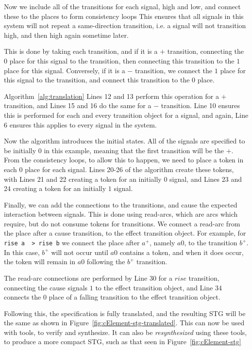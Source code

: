 \documentclass[british,conference,compsoc]{IEEEtran}
\begin{document}
Now we include all of the 
transitions for each signal, high and low, and connect these to the places to form consistency loops
This ensures that all signals in this system will not repeat a same-direction transition, i.e. a signal will
not transition high, and then high again sometime later.

This is done by taking each transition, and if it is a $+$ transition, 
connecting the $0$ place for this signal to the transition, then connecting 
this transition to the $1$ place for this signal. Conversely, if it is a $-$ 
transition, we connect the $1$ place for this signal to the transition, and 
connect this transition to the $0$ place.

Algorithm~\ref{alg:translation} Lines 12 and 13 perform this operation for a $+$ transition,
and Lines 15 and 16 do the same for a $-$ transition. Line 10 ensures this is performed for 
each and every transition object for a signal, and again, Line 6 ensures this applies to every signal
in the system. 

Now the algorithm introduces the initial states. All of the signals are 
specified to be initially 0 in this example, meaning that the first transition will be the $+$.
From the consistency loops, to allow this to happen, we need to place a token 
in each $0$ place for each signal. Lines 20-26 of the algorithm create these tokens,
with Lines 21 and 22 creating a token for an initially $0$ signal, and Lines 23 and 24 
creating a token for an initially $1$ signal. 

Finally, we can add the connections to the transitions, and cause the 
expected interaction between signals. This is done using read-arcs, which 
are arcs which require, but do not consume tokens for transitions. We
connect a read-arc from the place after a cause transition, to the effect transition object. 
For example, for \texttt{rise a ~> rise b} we connect the place after $a^{+}$, namely $a0$,
to the transition $b^{+}$. In this case, $b^{+}$ will not occur until $a0$ contains a token,
and when it does occur, the token will remain in $a0$ following the $b^{+}$ transition. 

The read-arc connections are performed by Line 30 for a $rise$ transition, connecting the
cause signals $1$ to the effect transition object, and Line 34 connects the $0$ place of a 
falling transition to the effect transition object. 

Following this, the specification is fully translated, and the resulting STG 
will be the same as shown in Figure~\ref{fig:cElement-stg-translated}. 
This can now be used with tools, to verify and synthesize. It can also be
\emph{resynthesized} using these tools, to produce a more compact STG,
such as that seen in Figure~\ref{fig:cElement-stg}
\end{document}
